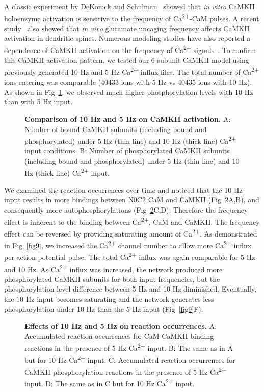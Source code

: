 \documentclass[10pt,letterpaper]{article}
\begin{document}
A classic experiment by DeKonick and Schulman~\cite{DeKoninck:1998wh} showed that \textit{in vitro} CaMKII holoenzyme activation is sensitive to the frequency of Ca\textsuperscript{2+}-CaM pulses. A recent study~\cite{Fujii:2013bg} also showed that \textit{in vivo} glutamate uncaging frequency affects CaMKII activation in dendritic spines. Numerous modeling studies have also reported a dependence of CaMKII activation on the frequency of Ca\textsuperscript{2+} signals~\cite{Pepke:2010ju,Dupont:2003vq,Michalski:2012ds,Kubota:2001ul}. To confirm this CaMKII activation pattern, we tested our 6-subunit CaMKII model using previously generated 10 Hz and 5 Hz Ca\textsuperscript{2+} influx files. The total number of Ca\textsuperscript{2+} ions entering was comparable (40433 ions with 5 Hz vs 40435 ions with 10 Hz). As shown in Fig~\ref{fig7}, we observed much higher phosphorylation levels with 10 Hz than with 5 Hz input.

\begin{figure}[!h]
	\caption{{\bf Comparison of 10 Hz and 5 Hz on CaMKII activation.}
	A: Number of bound CaMKII subunits (including bound and phosphorylated) under 5 Hz (thin line) and 10 Hz (thick line) Ca\textsuperscript{2+} input conditions.
	B: Number of phosphorylated CaMKII subunits (including bound and phosphorylated) under 5 Hz (thin line) and 10 Hz (thick line) Ca\textsuperscript{2+} input.
	}
\label{fig7}
\end{figure}

We examined the reaction occurrences over time and noticed that the 10 Hz input results in more bindings between N0C2 CaM and CaMKII (Fig~\ref{fig8}A,B), and consequently more autophosphorylations (Fig~\ref{fig8}C,D). Therefore the frequency effect is inherent to the binding between Ca\textsuperscript{2+}, CaM and CaMKII. The frequency effect can be reversed by providing saturating amount of Ca\textsuperscript{2+}. As demonstrated in Fig~\ref{fig9}, we increased the Ca\textsuperscript{2+} channel number to allow more Ca\textsuperscript{2+} influx per action potential pulse. The total Ca\textsuperscript{2+} influx was again comparable for 5 Hz and 10 Hz. As Ca\textsuperscript{2+} influx was increased, the network produced more phosphorylated CaMKII subunits for both input frequencies, but the phosphorylation level difference between 5 Hz and 10 Hz diminished. Eventually, the 10 Hz input becomes saturating and the network generates less phosphorylation under 10 Hz than the 5 Hz input (Fig~\ref{fig9}F).
\begin{figure}[!h]
	\caption{{\bf Effects of 10 Hz and 5 Hz on reaction occurrences.} 
	A: Accumulated reaction occurrences for CaM CaMKII binding reactions in the presence of 5 Hz Ca\textsuperscript{2+} input. 
	B: The same as in A but for 10 Hz Ca\textsuperscript{2+} input.
	C: Accumulated reaction occurrences for CaMKII phosphorylation reactions in the presence of 5 Hz Ca\textsuperscript{2+} input. 
	D: The same as in C but for 10 Hz Ca\textsuperscript{2+} input.
	}
\label{fig8}
\end{figure}
\end{document}
